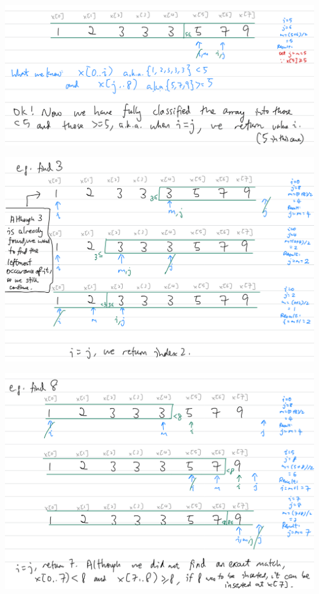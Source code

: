 \includegraphics[width=14cm]{images/ch7-binarysearch52.png}

\includegraphics[width=14cm]{images/ch7-binarysearch3.png}

\includegraphics[width=14cm]{images/ch7-binarysearch8.png}

